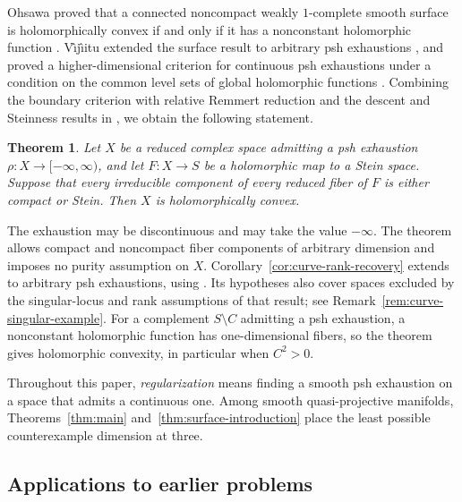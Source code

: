 \documentclass[11pt]{amsart}
\newtheorem{theorem}{Theorem}[section]
\theoremstyle{definition}
\theoremstyle{remark}
\numberwithin{equation}{section}
\begin{document}
Ohsawa proved that a connected noncompact weakly $1$-complete
smooth surface is holomorphically convex if and only if it has
a nonconstant holomorphic function
\cite[Proposition~1.4, p.~156]{Ohsawa1981}.
V\^{\i}j\^{\i}itu extended the surface result to arbitrary psh
exhaustions \cite[Theorem~1.1]{Vajaitu2022}, and proved a
higher-dimensional criterion for continuous psh exhaustions
under a condition on the common level sets of global holomorphic
functions \cite[Theorem~1.1]{VijituForum2022}.
Combining the boundary criterion
\cite[Corollary~2.5]{VijituForum2022} with relative Remmert
reduction and the descent and Steinness results in
\cite[Propositions~3.1, 4.2, and~4.4]{Vajaitu2022}, we obtain
the following statement.

\begin{theorem}\label{thm:fiber-introduction}
Let $X$ be a reduced complex space admitting a psh exhaustion
$\rho:X\to[-\infty,\infty)$, and let $F:X\to S$ be a
holomorphic map to a Stein space.
Suppose that every irreducible component of every reduced
fiber of $F$ is either compact or Stein.
Then $X$ is holomorphically convex.
\end{theorem}

The exhaustion may be discontinuous and may take the value
$-\infty$. The theorem allows compact and noncompact fiber
components of arbitrary dimension and imposes no purity
assumption on $X$.
Corollary~\ref{cor:curve-rank-recovery} extends
\cite[Theorem~1.1]{VijituForum2022} to arbitrary psh exhaustions,
using \cite[Theorem~3.1]{VijituForum2022}.
Its hypotheses also cover spaces excluded by the singular-locus
and rank assumptions of that result; see
Remark~\ref{rem:curve-singular-example}.
For a complement $S\setminus C$ admitting a psh exhaustion,
a nonconstant holomorphic function has one-dimensional fibers,
so the theorem gives holomorphic convexity, in particular
when $C^2>0$.

Throughout this paper, \emph{regularization} means finding a smooth
psh exhaustion on a space that admits a continuous one. Among smooth
quasi-projective manifolds, Theorems~\ref{thm:main}
and~\ref{thm:surface-introduction} place the least possible
counterexample dimension at three.

\subsection{Applications to earlier problems}\label{subsec:applications}
\end{document}
